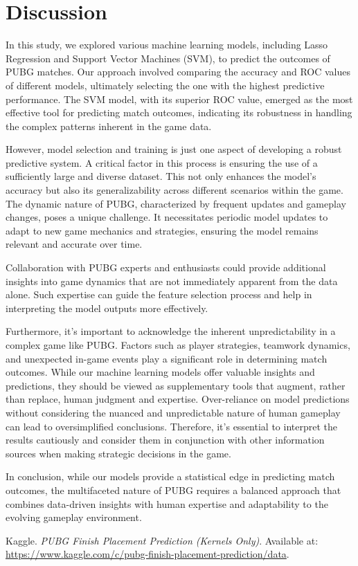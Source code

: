 \documentclass[12pt]{article}
\begin{document}
\section{Discussion}
\label{sec:disc}



In this study, we explored various machine learning models, including Lasso Regression and Support Vector Machines (SVM), to predict the outcomes of PUBG matches. Our approach involved comparing the accuracy and ROC values of different models, ultimately selecting the one with the highest predictive performance. The SVM model, with its superior ROC value, emerged as the most effective tool for predicting match outcomes, indicating its robustness in handling the complex patterns inherent in the game data.

However, model selection and training is just one aspect of developing a robust predictive system. A critical factor in this process is ensuring the use of a sufficiently large and diverse dataset. This not only enhances the model's accuracy but also its generalizability across different scenarios within the game. The dynamic nature of PUBG, characterized by frequent updates and gameplay changes, poses a unique challenge. It necessitates periodic model updates to adapt to new game mechanics and strategies, ensuring the model remains relevant and accurate over time.

Collaboration with PUBG experts and enthusiasts could provide additional insights into game dynamics that are not immediately apparent from the data alone. Such expertise can guide the feature selection process and help in interpreting the model outputs more effectively.

Furthermore, it's important to acknowledge the inherent unpredictability in a complex game like PUBG. Factors such as player strategies, teamwork dynamics, and unexpected in-game events play a significant role in determining match outcomes. While our machine learning models offer valuable insights and predictions, they should be viewed as supplementary tools that augment, rather than replace, human judgment and expertise. Over-reliance on model predictions without considering the nuanced and unpredictable nature of human gameplay can lead to oversimplified conclusions. Therefore, it's essential to interpret the results cautiously and consider them in conjunction with other information sources when making strategic decisions in the game.

In conclusion, while our models provide a statistical edge in predicting match outcomes, the multifaceted nature of PUBG requires a balanced approach that combines data-driven insights with human expertise and adaptability to the evolving gameplay environment.





\begin{thebibliography}{9}
	Kaggle. 
	\textit{PUBG Finish Placement Prediction (Kernels Only)}. 
	Available at: \url{https://www.kaggle.com/c/pubg-finish-placement-prediction/data}.
	
\end{thebibliography}
\end{document}
